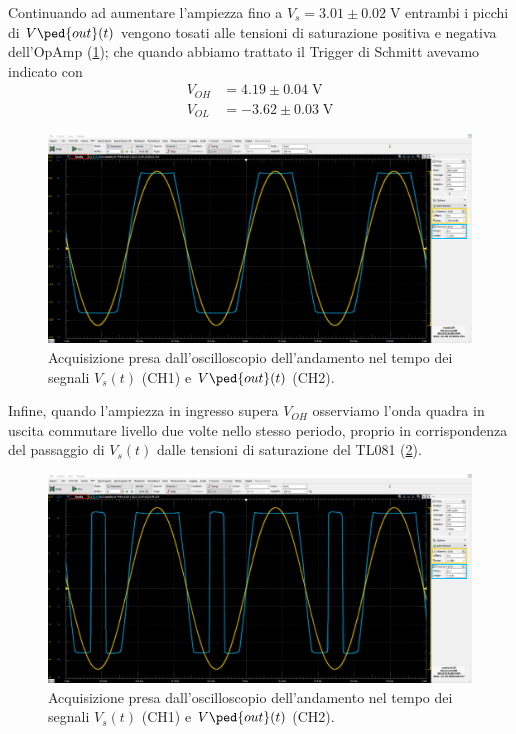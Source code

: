 \documentclass[10pt, a4paper, italian]{article}
\begin{document}
Continuando ad aumentare l'ampiezza fino a $V_s = 3.01 \pm 0.02 \; \si{\V}$
entrambi i picchi di $V\ped{out} (t)$ vengono tosati alle tensioni di
saturazione positiva e negativa dell'OpAmp (\cref{fig: aloop3}); che quando
abbiamo trattato il Trigger di Schmitt avevamo indicato con
\begin{align*}
V_{OH} &= 4.19 \pm 0.04 \; \si{\V} \\
V_{OL} &= -3.62 \pm 0.03 \; \si{\V}
\end{align*} 
\begin{figure}[htbp]
	\centering
	\includegraphics[scale=0.335]{Aloop3V}
	\caption{Acquisizione presa dall'oscilloscopio dell'andamento nel tempo dei
	segnali $V_s (t)$ (CH1) e $V\ped{out} (t)$ (CH2). \label{fig: aloop3}}
\end{figure}

Infine, quando l'ampiezza in ingresso supera $V_{OH}$ osserviamo l'onda quadra
in uscita commutare livello due volte nello stesso periodo, proprio in
corrispondenza del passaggio di $V_s (t)$ dalle tensioni di saturazione del
TL081 (\cref{fig: aloop4.5}).
\begin{figure}[htbp]
	\centering
	\includegraphics[scale=0.335]{Aloop4.5V}
	\caption{Acquisizione presa dall'oscilloscopio dell'andamento nel tempo dei
	segnali $V_s (t)$ (CH1) e $V\ped{out} (t)$ (CH2). \label{fig: aloop4.5}}
\end{figure}
\end{document}
